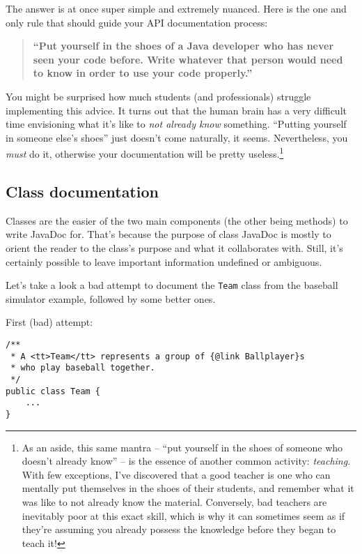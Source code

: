 \pagebreak
The answer is at once super simple and extremely nuanced. Here is the one and
only rule that should guide your API documentation process:

\begin{shaded}
\begin{quote}

\textbf{\textsf{``Put yourself in the shoes of a Java developer who has never
seen your code before. Write whatever that person would need to know in order
to use your code properly.''}}

\end{quote}
\end{shaded}

You might be surprised how much students (and professionals) struggle
implementing this advice. It turns out that the human brain has a very
difficult time envisioning what it's like to \textit{not already know}
something. ``Putting yourself in someone else's shoes'' just doesn't come
naturally, it seems. Nevertheless, you \textit{must} do it, otherwise your
documentation will be pretty useless.\footnote{As an aside, this same mantra
-- ``put yourself in the shoes of someone who doesn't already know'' -- is the
essence of another common activity: \textit{teaching}. With few exceptions,
I've discovered that a good teacher is one who can mentally put themselves in
the shoes of their students, and remember what it was like to not already know
the material. Conversely, bad teachers are inevitably poor at this exact
skill, which is why it can sometimes seem as if they're assuming you already
possess the knowledge before they began to teach it!}


\subsection{Class documentation}

Classes are the easier of the two main components (the other being methods) to
write JavaDoc for. That's because the purpose of class JavaDoc is mostly to
orient the reader to the class's purpose and what it collaborates with. Still,
it's certainly possible to leave important information undefined or ambiguous.

Let's take a look a bad attempt to document the \texttt{Team} class from the
baseball simulator example, followed by some better ones.

\pagebreak
First (bad) attempt:
\vspace{-.15in}
\begin{Verbatim}[fontsize=\footnotesize,samepage=true,frame=single]
/**
 * A <tt>Team</tt> represents a group of {@link Ballplayer}s
 * who play baseball together.
 */
public class Team {
    ...
}
\end{Verbatim}
\vspace{-.1in}

